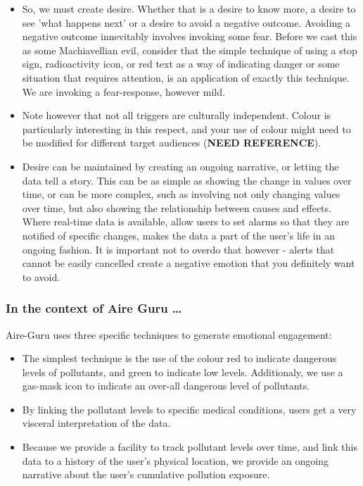 \begin{itemize}
    \item So, we must create desire. Whether that is a desire to know more, a desire to see 'what happens next' or a desire to avoid a negative outcome.
    Avoiding a negative outcome innevitably involves invoking some fear. Before we cast this as some Machiavellian evil, consider that the simple
    technique of using a stop sign, radioactivity icon, or red text as a way of indicating danger or some situation that requires attention, is an
    application of exactly this technique. We are invoking a fear-response, however mild.

    \item Note however that not all triggers are culturally independent. Colour is particularly interesting in this respect, and your use of colour might
    need to be modified for different target audiences (\textbf{NEED REFERENCE}).

    \item Desire can be maintained by creating an ongoing narrative, or letting the data tell a story. This can be as simple as showing the change in 
    values over time, or can be more complex, such as involving not only changing values over time, but also showing the relationship between causes and
    effects. Where real-time data is available, allow users to set alarms so that they are notified of specific changes, makes the data a part of the user's
    life in an ongoing fashion. It is important not to overdo that however - alerts that cannot be easily cancelled create a negative emotion that you
    definitely want to avoid.
\end{itemize}

\subsubsection*{In the context of Aire Guru \ldots}

Aire-Guru uses three specific techniques to generate emotional engagement:

\begin{itemize}

    \item The simplest technique is the use of the colour red to indicate dangerous levels of pollutants, and green to indicate low levels.
    Additionaly, we use a gas-mask icon to indicate an over-all dangerous level of pollutants.

    \item By linking the pollutant levels to specific medical conditions, users get a very visceral interpretation of the data.
    
    \item Because we provide a facility to track pollutant levels over time, and link this data to a history of the user's physical location, we provide
    an ongoing narrative about the user's cumulative pollution exposure.

\end{itemize}